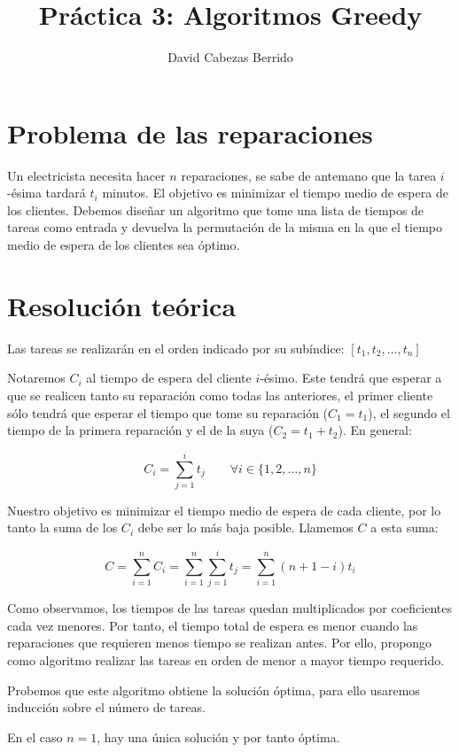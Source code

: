 \documentclass[a4]{article}
\author{David Cabezas Berrido}
\date{\vspace{-5mm}}
\title{\huge Práctica 3: Algoritmos Greedy \HRule\vspace{-4mm}}
\begin{document}
\maketitle
\vspace{20mm}
\tableofcontents
\newpage

\section{Problema de las reparaciones}
Un electricista necesita hacer $n$ reparaciones, se sabe de antemano
que la tarea $i$-ésima tardará $t_i$ minutos. El objetivo es minimizar
el tiempo medio de espera de los clientes. Debemos diseñar un
algoritmo que tome una lista de tiempos de tareas como entrada y
devuelva la permutación de la misma en la que el tiempo medio de
espera de los clientes sea óptimo.

\section{Resolución teórica}

Las tareas se realizarán en el orden indicado por su subíndice:
$[t_1, t_2,\ldots,t_n]$

Notaremos $C_i$ al tiempo de espera del cliente $i$-ésimo. Este tendrá
que esperar a que se realicen tanto su reparación como todas las
anteriores, el primer cliente sólo tendrá que esperar el tiempo que
tome su reparación ($C_1=t_1$), el segundo el tiempo de la primera
reparación y el de la suya ($C_2=t_1+t_2$). En general:

\[C_i=\sum_{j=1}^it_j \qquad \forall i \in \{1,2,\ldots,n\}\]

Nuestro objetivo es minimizar el tiempo medio de espera de cada
cliente, por lo tanto la suma de los $C_i$ debe ser lo más baja
posible. Llamemos $C$ a esta suma:

\[C = \sum_{i=1}^n C_i = \sum_{i=1}^n \sum_{j=1}^i t_j =
  \sum_{i=1}^n(n+1-i)t_i\]

Como observamos, los tiempos de las tareas quedan multiplicados por
coeficientes cada vez menores. Por tanto, el tiempo total de espera es
menor cuando las reparaciones que requieren menos tiempo se realizan
antes. Por ello, propongo como algoritmo realizar las tareas en orden
de menor a mayor tiempo requerido.

Probemos que este algoritmo obtiene la solución óptima, para ello
usaremos inducción sobre el número de tareas.

En el caso $n=1$, hay una única solución y por tanto óptima.
\end{document}
